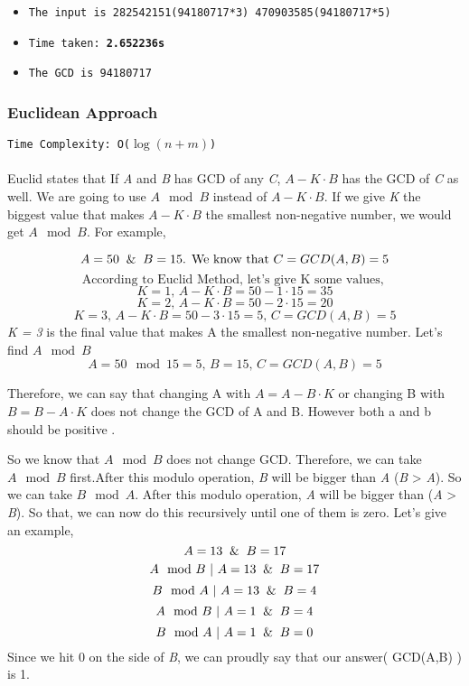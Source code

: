 \documentclass[12pt]{article}
\begin{document}
\begin{itemize}
  \item \texttt{The input is 282542151(94180717*3) 470903585(94180717*5) } 
  \item \texttt{Time taken: \textbf{2.652236s}} 
  \item \texttt{The GCD is 94180717}
\end{itemize}

\subsubsection{Euclidean Approach}
\texttt{Time Complexity:  O($\log{(n+m)}$) } \\ \\
Euclid states that If \textit{A} and \textit{B} has GCD of any \textit{C}, \texttt{$A-K \cdot B$} has the GCD of \textit{C} as well. We are going to use \texttt{$A \mod B$} instead of \texttt{$A-K \cdot B$}. If we give \textit{K} the biggest value that makes \texttt{$A-K \cdot B$} the smallest non-negative number, we would get \textit{$A \mod B$}. For example,

\[ A = 50 \And B = 15  \text{.     We know that  } C = GCD(A,B) = 5 \]
\[ \text{According to Euclid Method, let's give K some values, } \]
\[ K = 1 \text{, } \texttt{$A-K \cdot B$} = 50 - 1 \cdot 15  = 35  \]
\[ K = 2 \text{, } \texttt{$A-K \cdot B$} = 50 - 2 \cdot 15  = 20  \]
\[ K = 3 \text{, } \texttt{$A-K \cdot B$} = 50 - 3 \cdot 15  = 5 \text{, } C = GCD(A,B) = 5 \]
\textit{K = 3} is the final value that makes A the smallest non-negative number. Let's find $A \mod B$
\[ A = 50 \mod{15} = 5 \text{, } B = 15 \text{, } C = GCD(A,B) = 5 \]

Therefore, we can say that changing A with $A = A - B \cdot K$ or changing B with  $B = B - A \cdot K$ does not change the GCD of A and B. However both a and b should be positive \cite{euclideangcd}.

So we know that $A \mod B$ does not change GCD. Therefore, we can take $A \mod B$ first.After this modulo operation, \textit{B} will be bigger than \textit{A} (\textit{B} > \textit{A}). So we can take $B \mod A$. After this modulo operation, \textit{A} will be bigger than (\textit{A} > \textit{B}). So that, we can now do this recursively until one of them is zero. Let's give an example,
\[ A = 13 \And B = 17 \]
\[ A \mod{B} \text{  | } A = 13 \And B = 17 \]
\[ B \mod{A} \text{  | } A = 13 \And B = 4 \]
\[ A \mod{B} \text{  | } A = 1 \And B = 4 \]
\[ B \mod{A} \text{  | } A = 1 \And B = 0 \]
Since we hit 0 on the side of \textit{B}, we can proudly say that our answer( GCD(A,B) ) is 1.
\end{document}

